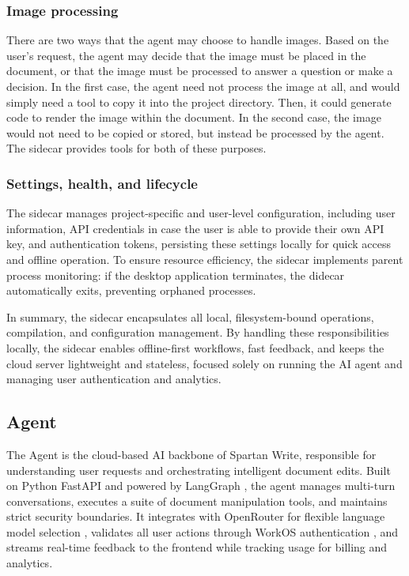 \subsubsection{Image processing}

There are two ways that the agent may choose to handle images.
Based on the user's request, the agent may decide that the image must be placed in the document, or that the image must be processed to answer a question or make a decision.
In the first case, the agent need not process the image at all, and would simply need a tool to copy it into the project directory.
Then, it could generate code to render the image within the document.
In the second case, the image would not need to be copied or stored, but instead be processed by the agent.
The sidecar provides tools for both of these purposes.

\subsubsection{Settings, health, and lifecycle}

The sidecar manages project-specific and user-level configuration, including user information, API credentials in case the user is able to provide their own API key, and authentication tokens, persisting these settings locally for quick access and offline operation.
To ensure resource efficiency, the sidecar implements parent process monitoring: if the desktop application terminates, the didecar automatically exits, preventing orphaned processes.

In summary, the sidecar encapsulates all local, filesystem-bound operations, compilation, and configuration management.
By handling these responsibilities locally, the sidecar enables offline-first workflows, fast feedback, and keeps the cloud server lightweight and stateless, focused solely on running the AI agent and managing user authentication and analytics.


\subsection{Agent}

The Agent is the cloud-based AI backbone of Spartan Write, responsible for understanding user requests and orchestrating intelligent document edits.
Built on Python FastAPI \cite{fastapi} and powered by LangGraph \cite{langgraph}, the agent manages multi-turn conversations, executes a suite of document manipulation tools, and maintains strict security boundaries.
It integrates with OpenRouter for flexible language model selection \cite{openrouter}, validates all user actions through WorkOS authentication \cite{workos}, and streams real-time feedback to the frontend while tracking usage for billing and analytics.

